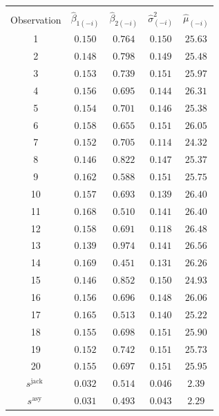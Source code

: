 \documentclass[10pt]{article}
\begin{document}
\begin{tabular}{ccccc}
\hline\hline
 &  &  &  &  \\
Observation & $\widehat{\beta}_{1(-i)}$ & $\widehat{\beta}_{2(-i)}$ & $\widehat{\sigma}_{(-i)}^{2}$ & $\widehat{\mu}_{(-i)}$ \\
\hline
1 & $0.150$ & $0.764$ & $0.150$ & $25.63$ \\
2 & $0.148$ & $0.798$ & $0.149$ & $25.48$ \\
3 & $0.153$ & $0.739$ & $0.151$ & $25.97$ \\
4 & $0.156$ & $0.695$ & $0.144$ & $26.31$ \\
5 & $0.154$ & $0.701$ & $0.146$ & $25.38$ \\
6 & $0.158$ & $0.655$ & $0.151$ & $26.05$ \\
7 & $0.152$ & $0.705$ & $0.114$ & $24.32$ \\
8 & $0.146$ & $0.822$ & $0.147$ & $25.37$ \\
9 & $0.162$ & $0.588$ & $0.151$ & $25.75$ \\
10 & $0.157$ & $0.693$ & $0.139$ & $26.40$ \\
11 & $0.168$ & $0.510$ & $0.141$ & $26.40$ \\
12 & $0.158$ & $0.691$ & $0.118$ & $26.48$ \\
13 & $0.139$ & $0.974$ & $0.141$ & $26.56$ \\
14 & $0.169$ & $0.451$ & $0.131$ & $26.26$ \\
15 & $0.146$ & $0.852$ & $0.150$ & $24.93$ \\
16 & $0.156$ & $0.696$ & $0.148$ & $26.06$ \\
17 & $0.165$ & $0.513$ & $0.140$ & $25.22$ \\
18 & $0.155$ & $0.698$ & $0.151$ & $25.90$ \\
19 & $0.152$ & $0.742$ & $0.151$ & $25.73$ \\
20 & $0.155$ & $0.697$ & $0.151$ & $25.95$ \\
$s^{\text {jack }}$ & $0.032$ & $0.514$ & $0.046$ & $2.39$ \\
$s^{\text {asy }}$ & $0.031$ & $0.493$ & $0.043$ & $2.29$ \\
\hline
\end{tabular}
\end{document}
